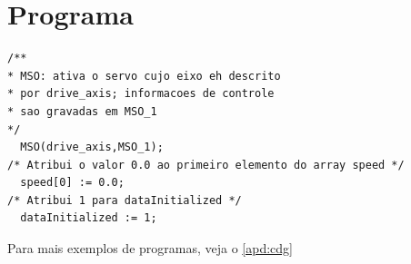 \section{Programa}

\begin{lstlisting}
/**
* MSO: ativa o servo cujo eixo eh descrito
* por drive_axis; informacoes de controle
* sao gravadas em MSO_1
*/
  MSO(drive_axis,MSO_1);
/* Atribui o valor 0.0 ao primeiro elemento do array speed */
  speed[0] := 0.0; 
/* Atribui 1 para dataInitialized */
  dataInitialized := 1;
\end{lstlisting}

Para mais exemplos de programas, veja o \autoref{apd:cdg}